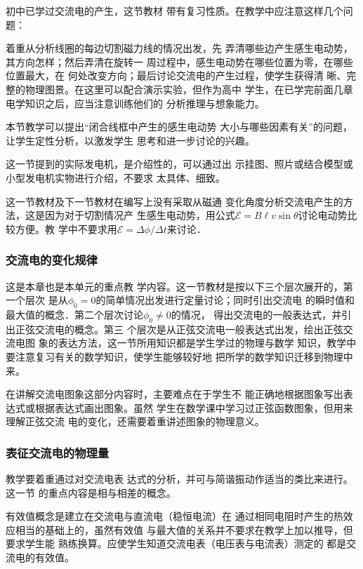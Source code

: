 初中已学过交流电的产生，这节教材
带有复习性质。在教学中应注意这样几个问题：

着重从分析线圈的每边切割磁力线的情况出发，先
弄清哪些边产生感生电动势，其方向怎样；然后弄清在旋转一
周过程中，感生电动势在哪些位置为零，在哪些位置最大，在
何处改变方向；最后讨论交流电的产生过程，使学生获得清
晰、完整的物理图景。在这里可以配合演示实验，但作为高中
学生，在已学完前面几章电学知识之后，应当注意训练他们的
分析推理与想象能力。

本节教学可以提出“闭合线框中产生的感生电动势
大小与哪些因素有关”的问题，让学生定性分析，以激发学生
思考和进一步讨论的兴趣。

这一节提到的实际发电机，是介绍性的，可以通过出
示挂图、照片或结合模型或小型发电机实物进行介绍，不要求
太具体、细致。

这一节教材及下一节教材在编写上没有采取从磁通
变化角度分析交流电产生的方法，这是因为对于切割情况产
生感生电动势，用公式$\mathcal{E}=B\ell v\sin\theta$讨论电动势比较方便。教
学中不要求用$\mathcal{E}=\Delta\phi/\Delta t$来讨论．

\subsubsection{交流电的变化规律}

这是本章也是本单元的重点教
学内容。这一节教材是按以下三个层次展开的，第一个层次
是从$\phi_0=0$的简单情况出发进行定量讨论；同时引出交流电
的瞬时值和最大值的概念．第二个层次讨论$\phi_0\ne 0$的情况，
得出交流电的一般表达式，并引出正弦交流电的概念。第三
个层次是从正弦交流电一般表达式出发，绘出正弦交流电图
象的表达方法，这一节所用知识都是学生学过的物理与数学
知识，教学中要注意复习有关的数学知识，使学生能够较好地
把所学的数学知识迁移到物理中来。

在讲解交流电图象这部分内容时，主要难点在于学生不
能正确地根据图象写出表达式或根据表达式画出图象。虽然
学生在数学课中学习过正弦函数图象，但用来理解正弦交流
电的变化，还需要着重讲述图象的物理意义。

\subsubsection{表征交流电的物理量}

教学要着重通过对交流电表
达式的分析，并可与简谐振动作适当的类比来进行。这一节
的重点内容是相与相差的概念。

有效值概念是建立在交流电与直流电（稳恒电流）在
通过相同电阻时产生的热效应相当的基础上的，虽然有效值
与最大值的关系并不要求在教学上加以推导，但要求学生能
熟练换算。应使学生知道交流电表（电压表与电流表）测定的
都是交流电的有效值。

